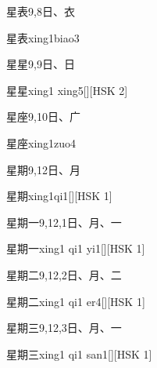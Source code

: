 \begin{entry}{星表}{9,8}{⽇、⾐}
  \begin{phonetics}{星表}{xing1biao3}
  \end{phonetics}
\end{entry}

\begin{entry}{星星}{9,9}{⽇、⽇}
  \begin{phonetics}{星星}{xing1 xing5}[][HSK 2]
  \end{phonetics}
\end{entry}

\begin{entry}{星座}{9,10}{⽇、⼴}
  \begin{phonetics}{星座}{xing1zuo4}
  \end{phonetics}
\end{entry}

\begin{entry}{星期}{9,12}{⽇、⽉}
  \begin{phonetics}{星期}{xing1qi1}[][HSK 1]
  \end{phonetics}
\end{entry}

\begin{entry}{星期一}{9,12,1}{⽇、⽉、⼀}
  \begin{phonetics}{星期一}{xing1 qi1 yi1}[][HSK 1]
  \end{phonetics}
\end{entry}

\begin{entry}{星期二}{9,12,2}{⽇、⽉、⼆}
  \begin{phonetics}{星期二}{xing1 qi1 er4}[][HSK 1]
  \end{phonetics}
\end{entry}

\begin{entry}{星期三}{9,12,3}{⽇、⽉、⼀}
  \begin{phonetics}{星期三}{xing1 qi1 san1}[][HSK 1]
  \end{phonetics}
\end{entry}

